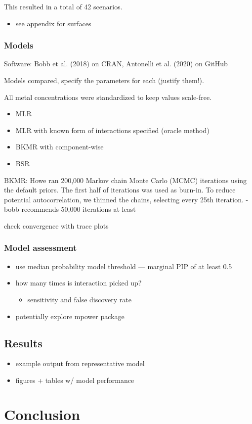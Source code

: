 \documentclass[12pt, twoside]{amherstthesis}
\providecommand{\tightlist}{%
  \setlength{\itemsep}{0pt}\setlength{\parskip}{0pt}}
\begin{document}
This resulted in a total of 42 scenarios.
\begin{itemize}
\tightlist
\item
  see appendix for surfaces
\end{itemize}
\hypertarget{models}{%
\subsection{Models}\label{models}}

Software: Bobb et al. (2018) on CRAN, Antonelli et al. (2020) on GitHub

Models compared, specify the parameters for each (justify them!).

All metal concentrations were standardized to keep values scale-free.
\begin{itemize}
\tightlist
\item
  MLR
\item
  MLR with known form of interactions specified (oracle method)
\item
  BKMR with component-wise
\item
  BSR
\end{itemize}
BKMR:
Howe ran 200,000 Markov chain Monte Carlo (MCMC) iterations using the default priors. The first half of iterations was used as burn-in. To reduce potential autocorrelation, we thinned the chains, selecting every 25th iteration.
- bobb recommends 50,000 iterations at least

check convergence with trace plots

\hypertarget{model-assessment}{%
\subsection{Model assessment}\label{model-assessment}}
\begin{itemize}
\tightlist
\item
  use median probability model threshold --- marginal PIP of at least 0.5
\item
  how many times is interaction picked up?
  \begin{itemize}
  \tightlist
  \item
    sensitivity and false discovery rate
  \end{itemize}
\item
  potentially explore mpower package
\end{itemize}
\hypertarget{results}{%
\section{Results}\label{results}}
\begin{itemize}
\tightlist
\item
  example output from representative model
\item
  figures + tables w/ model performance
\end{itemize}
\hypertarget{conclusion}{%
\chapter*{Conclusion}\label{conclusion}}
\end{document}
